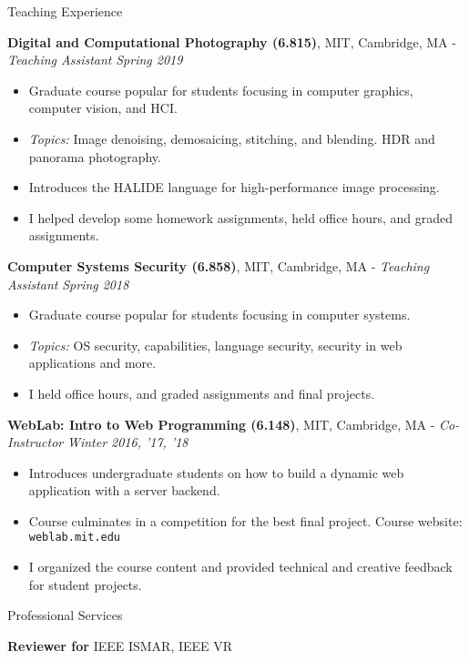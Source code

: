 \documentclass{resume}
\begin{document}
\begin{area}{Teaching Experience}
    \item
        \textbf{Digital and Computational Photography (6.815)}, MIT, Cambridge, MA - \emph{Teaching Assistant} \hfill \emph{Spring 2019}
        \begin{itemize}
            \item Graduate course popular for students focusing in computer graphics, computer vision, and HCI.
            \item \emph{Topics:} Image denoising, demosaicing, stitching, and blending. HDR and panorama photography.
            \item Introduces the HALIDE language for high-performance image processing.
            \item I helped develop some homework assignments, held office hours, and graded assignments.
        \end{itemize}
    \item
        \textbf{Computer Systems Security (6.858)}, MIT, Cambridge, MA - \emph{Teaching Assistant} \hfill \emph{Spring 2018}
        \begin{itemize}
            \item Graduate course popular for students focusing in computer systems.
            \item \emph{Topics:} OS security, capabilities, language security, security in web applications and more.
            \item I held office hours, and graded assignments and final projects.
        \end{itemize}
    \item
        \textbf{WebLab: Intro to Web Programming (6.148)}, MIT, Cambridge, MA - \emph{Co-Instructor} \hfill \emph{Winter 2016, '17, '18}
        \begin{itemize}
            \item Introduces undergraduate students on how to build a dynamic web application with a server backend.
            \item Course culminates in a competition for the best final project. Course website: \texttt{weblab.mit.edu}
            \item I organized the course content and provided technical and creative feedback for student projects.
        \end{itemize}
\end{area}

\begin{area}{Professional Services}
    \item \textbf{Reviewer for} IEEE ISMAR, IEEE VR
\end{area}
\end{document}
